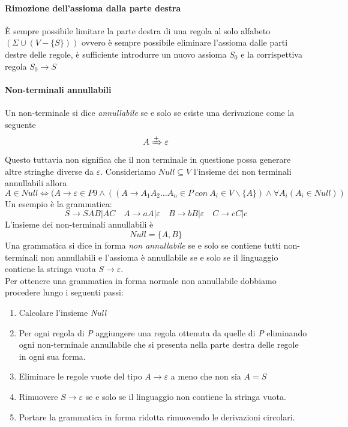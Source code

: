 \paragraph{Rimozione dell'assioma dalla parte destra}
È sempre possibile limitare la parte destra di una regola al solo alfabeto $ (\Sigma \cup (V-\{S\})) $ ovvero è sempre possibile eliminare l'assioma dalle parti destre delle regole, è sufficiente introdurre un nuovo assioma $ S_0 $ e la corrispettiva regola $ S_0\rightarrow S $
\paragraph{Non-terminali annullabili}
Un non-terminale si dice \emph{annullabile} se e solo se esiste una derivazione come la seguente
$$A\xRightarrow{+}\varepsilon$$
Questo tuttavia non significa che il non terminale in questione possa generare altre stringhe diverse da $ \varepsilon $.
Consideriamo $ Null\subseteq V $ l'insieme dei non terminali annullabili allora
$$A \in Null \iff (A\rightarrow \varepsilon \in P9 \wedge ((A\rightarrow A_1A_2\dots A_n \in P \ con \ A_i\in V\backslash\{A\})\wedge \forall A_i (A_i \in Null))$$
Un esempio è la grammatica:
$$S\rightarrow SAB | AC \quad A\rightarrow aA|\varepsilon \quad B\rightarrow bB|\varepsilon \quad C\rightarrow cC|c$$
L'insieme dei non-terminali annullabili è 
$$Null= \{ A,B\}$$
Una grammatica si dice in forma \emph{non annullabile} se e solo se contiene tutti non-terminali non annullabili e l'assioma è annullabile se e solo se il linguaggio contiene la stringa vuota $S\rightarrow \varepsilon$.\\
Per ottenere una grammatica in forma normale non annullabile dobbiamo procedere lungo i seguenti passi:
\begin{enumerate}
	\item Calcolare l'insieme \emph{Null}
	\item Per ogni regola di \emph{P} aggiungere una regola ottenuta da quelle di \emph{P} eliminando ogni non-terminale annullabile che si presenta nella parte destra delle regole in ogni sua forma.
	\item Eliminare le regole vuote del tipo $ A\rightarrow \varepsilon $ a meno che non sia $ A=S $
	\item Rimuovere $ S\rightarrow \varepsilon $ se e solo se il linguaggio non contiene la stringa vuota.
	\item Portare la grammatica in forma ridotta rimuovendo le derivazioni circolari.
\end{enumerate}
